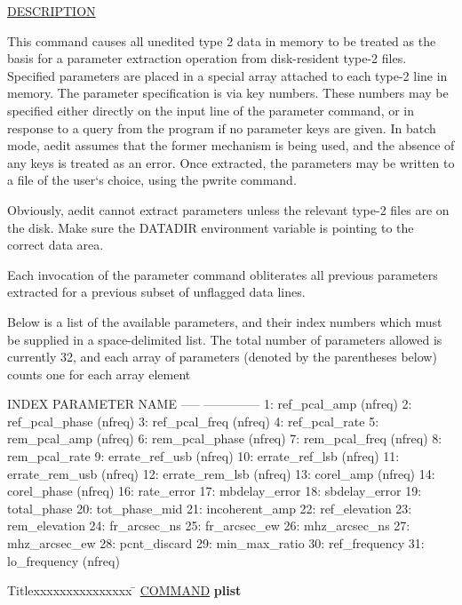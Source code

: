 \underline{DESCRIPTION}
\begin{list}{}{\setlength{\leftmargin}{0.5in}
     \setlength{\rightmargin}{0in}}
\item
This command causes all unedited type 2 data in memory to be treated as the
basis for a parameter extraction operation from disk-resident type-2 files.
Specified parameters are placed in a special array attached to each type-2 line
in memory.  The parameter specification is via key numbers.  These numbers
may be specified either directly on the input line of the parameter command,
or in response to a query from the program if no parameter keys are given.
In batch mode, aedit assumes that the former mechanism is being used, and
the absence of any keys is treated as an error.  Once extracted, the parameters
may be written to a file of the user`s choice, using the pwrite command.
\item
Obviously, aedit cannot extract parameters unless the relevant type-2 files are
on the disk.  Make sure the DATADIR environment variable is pointing to the 
correct data area.
\item
Each invocation of the parameter command obliterates all previous parameters
extracted for a previous subset of unflagged data lines.
\item
Below is a list of the available parameters, and their index numbers which
must be supplied in a space-delimited list.  The total number of parameters 
allowed is currently 32, and each array of parameters (denoted by the parentheses 
below) counts one for each array element
\item
INDEX    PARAMETER NAME
-----    --------------
 1:     ref_pcal_amp (nfreq)
 2:     ref_pcal_phase (nfreq)
 3:     ref_pcal_freq (nfreq)
 4:     ref_pcal_rate
 5:     rem_pcal_amp (nfreq)
 6:     rem_pcal_phase (nfreq)
 7:     rem_pcal_freq (nfreq)
 8:     rem_pcal_rate
 9:     errate_ref_usb (nfreq)
10:     errate_ref_lsb (nfreq)
11:     errate_rem_usb (nfreq)
12:     errate_rem_lsb (nfreq)
13:     corel_amp (nfreq)
14:     corel_phase (nfreq)
16:     rate_error
17:     mbdelay_error
18:     sbdelay_error
19:     total_phase
20:     tot_phase_mid
21:     incoherent_amp
22:     ref_elevation
23:     rem_elevation
24:     fr_arcsec_ns
25:     fr_arcsec_ew
26:     mhz_arcsec_ns
27:     mhz_arcsec_ew
28:     pcnt_discard
29:     min_max_ratio
30:     ref_frequency
31:     lo_frequency (nfreq)
\end{list}
\vspace{.2in}

\begin{tabbing}
Titlexxxxxxxxxxxxxxx \= \kill
\underline{COMMAND} \> {\bf 	plist} \\
\end{tabbing}

